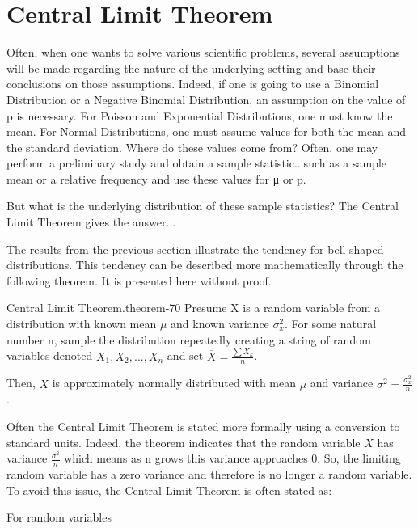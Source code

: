 \documentclass[10pt,]{book}
\numberwithin{equation}{section}
\begin{document}
\section[{Central Limit Theorem}]{Central Limit Theorem}\label{section-62}
\hypertarget{p-1062}{}%
Often, when one wants to solve various scientific problems, several assumptions will be made regarding the nature of the underlying setting and base their conclusions on those assumptions.  Indeed, if one is going to use a Binomial Distribution or a Negative Binomial Distribution, an assumption on the value of p is necessary.  For Poisson and Exponential Distributions, one must know the mean.  For Normal Distributions, one must assume values for both the mean and the standard deviation.   Where do these values come from?  Often, one may perform a preliminary study and obtain a sample statistic...such as a sample mean or a relative frequency and use these values for μ or p.%
\par
\hypertarget{p-1063}{}%
But what is the underlying distribution of these sample statistics?  The Central Limit Theorem gives the answer...%
\par
\hypertarget{p-1064}{}%
The results from the previous section illustrate the tendency for bell-shaped distributions. This tendency can be described more mathematically through the following theorem. It is presented here without proof.%
\begin{theorem}{Central Limit Theorem.}{}{theorem-70}%
\hypertarget{p-1065}{}%
Presume X is a random variable from a distribution with known mean \(\mu\) and known variance \(\sigma_x^2\). For some natural number n, sample the distribution repeatedly creating a string of random variables denoted \(X_1, X_2, ... , X_n\) and set \(\overline{X} = \frac{\sum X_k}{n}\).%
\par
\hypertarget{p-1066}{}%
Then, \(\overline{X}\) is approximately normally distributed with mean \(\mu\) and variance \(\sigma^2 = \frac{\sigma_x^2}{n}\).%
\end{theorem}
\hypertarget{p-1067}{}%
Often the Central Limit Theorem is stated more formally using a conversion to standard units. Indeed, the theorem indicates that the random variable \(\overline{X}\) has variance \(\frac{\sigma^2}{n}\) which means as n grows this variance approaches 0. So, the limiting random variable has a zero variance and therefore is no longer a random variable. To avoid this issue, the Central Limit Theorem is often stated as:%
\par
\hypertarget{p-1068}{}%
For random variables%
\end{document}
